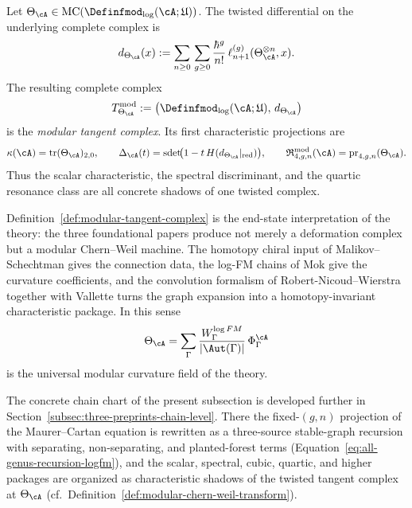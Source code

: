 \begin{definition}
\label{def:modular-tangent-complex}
Let $\Theta_\cA\in \operatorname{MC}(\Definfmod_{\log}(\cA;\mathfrak U))$.
The twisted differential on the underlying complete complex is
\begin{equation}
\label{eq:twisted-differential-theta}
d_{\Theta_\cA}(x)
:=
\sum_{n\ge 0}\,\sum_{g\ge 0}
\frac{\hbar^g}{n!}\,
\ell_{n+1}^{(g)}(\Theta_\cA^{\otimes n},x).
\end{equation}
The resulting complete complex
\[
T^{\mathrm{mod}}_{\Theta_\cA}
:=
\bigl(\Definfmod_{\log}(\cA;\mathfrak U),\,d_{\Theta_\cA}\bigr)
\]
is the \emph{modular tangent complex}.  Its first characteristic
projections are
\begin{equation}
\label{eq:characteristic-projections-theta}
\kappa(\cA)=\operatorname{tr}(\Theta_\cA)_{2,0},
\qquad
\Delta_\cA(t)=\operatorname{sdet}\!\bigl(1-t\,H(d_{\Theta_\cA}|_{\mathrm{red}})\bigr),
\qquad
\mathfrak R^{\mathrm{mod}}_{4,g,n}(\cA)=\operatorname{pr}_{4,g,n}(\Theta_\cA).
\end{equation}
Thus the scalar characteristic, the spectral discriminant, and the
quartic resonance class are all concrete shadows of one twisted complex.
\end{definition}

\begin{remark}
\label{rem:modular-chern-weil-endstate}
Definition~\ref{def:modular-tangent-complex} is the end-state
interpretation of the theory: the three foundational papers produce not
merely a deformation complex but a modular Chern--Weil machine.  The
homotopy chiral input of Malikov--Schechtman gives the connection data,
the log-FM chains of Mok give the curvature coefficients, and the
convolution formalism of Robert-Nicoud--Wierstra together with Vallette
turns the graph expansion into a homotopy-invariant characteristic
package.  In this sense
\[
\Theta_\cA
=
\sum_{\Gamma}
\frac{W^{\log FM}_\Gamma}{|\Aut(\Gamma)|}\,\Phi^\cA_\Gamma
\]
is the universal modular curvature field of the theory.
\end{remark}

\begin{remark}
\label{rem:genus-recursion-and-characteristic-shadows-pointer}
The concrete chain chart of the present subsection is developed further in
Section~\ref{subsec:three-preprints-chain-level}.  There the
fixed-$(g,n)$ projection of the Maurer--Cartan equation is rewritten as a
three-source stable-graph recursion with separating, non-separating, and
planted-forest terms
\textup{(}Equation~\ref{eq:all-genus-recursion-logfm}\textup{)}, and the
scalar, spectral, cubic, quartic, and higher packages are organized as
characteristic shadows of the twisted tangent complex at $\Theta_\cA$
\textup{(}cf.~Definition~\ref{def:modular-chern-weil-transform}\textup{)}.
\end{remark}

